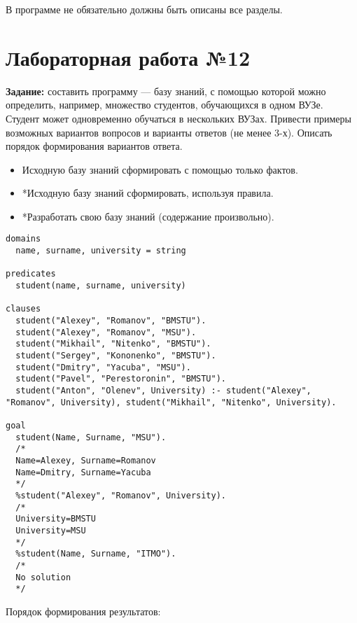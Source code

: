 В программе не обязательно должны быть описаны все разделы.

\chapter{Лабораторная работа №12}


\textbf{Задание:} составить программу --- базу знаний, с помощью которой можно определить, например, множество студентов, обучающихся в одном ВУЗе. Студент может одновременно обучаться в нескольких ВУЗах. Привести примеры возможных вариантов вопросов и варианты ответов (не менее 3-х). Описать порядок формирования вариантов ответа.
\begin{itemize}
    \item Исходную базу знаний сформировать с помощью только фактов.
    \item *Исходную базу знаний сформировать, используя правила.
    \item *Разработать свою базу знаний (содержание произвольно).
\end{itemize}


\begin{lstlisting}
domains
  name, surname, university = string
 
predicates
  student(name, surname, university)
  
clauses
  student("Alexey", "Romanov", "BMSTU").
  student("Alexey", "Romanov", "MSU").
  student("Mikhail", "Nitenko", "BMSTU").
  student("Sergey", "Kononenko", "BMSTU").
  student("Dmitry", "Yacuba", "MSU").
  student("Pavel", "Perestoronin", "BMSTU").
  student("Anton", "Olenev", University) :- student("Alexey", "Romanov", University), student("Mikhail", "Nitenko", University).
  
goal
  student(Name, Surname, "MSU").
  /*
  Name=Alexey, Surname=Romanov
  Name=Dmitry, Surname=Yacuba
  */
  %student("Alexey", "Romanov", University). 
  /*
  University=BMSTU
  University=MSU
  */
  %student(Name, Surname, "ITMO").
  /*
  No solution
  */
\end{lstlisting}

Порядок формирования результатов:

